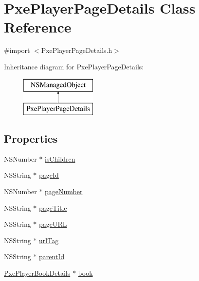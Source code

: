 \hypertarget{interface_pxe_player_page_details}{\section{Pxe\-Player\-Page\-Details Class Reference}
\label{interface_pxe_player_page_details}
}


{\ttfamily \#import $<$Pxe\-Player\-Page\-Details.\-h$>$}

Inheritance diagram for Pxe\-Player\-Page\-Details\-:\begin{figure}[H]
\begin{center}
\leavevmode
\includegraphics[height=2.000000cm]{interface_pxe_player_page_details}
\end{center}
\end{figure}
\subsection*{Properties}
\begin{DoxyCompactItemize}
\item 
N\-S\-Number $\ast$ \hyperlink{interface_pxe_player_page_details_a014167c06505941bf9634f8038b077d6}{is\-Children}
\item 
N\-S\-String $\ast$ \hyperlink{interface_pxe_player_page_details_a5a67b53e316c637fb9f251efc06dbb0a}{page\-Id}
\item 
N\-S\-Number $\ast$ \hyperlink{interface_pxe_player_page_details_a48af8f668bcac26661b2f62913a0d2a1}{page\-Number}
\item 
N\-S\-String $\ast$ \hyperlink{interface_pxe_player_page_details_a6b184fb3390508be1580cb0eb8a5ba40}{page\-Title}
\item 
N\-S\-String $\ast$ \hyperlink{interface_pxe_player_page_details_ae3b8a467041b75c0f224901ff9b7ab76}{page\-U\-R\-L}
\item 
N\-S\-String $\ast$ \hyperlink{interface_pxe_player_page_details_ad234d8017a3d5b7d76877bf682b879df}{url\-Tag}
\item 
N\-S\-String $\ast$ \hyperlink{interface_pxe_player_page_details_a89b10d9e8c8dd323eab65c4675596f80}{parent\-Id}
\item 
\hyperlink{interface_pxe_player_book_details}{Pxe\-Player\-Book\-Details} $\ast$ \hyperlink{interface_pxe_player_page_details_a6f45840f71adb8e50bd8f077d4368db6}{book}
\end{DoxyCompactItemize}


